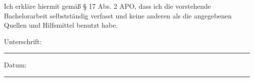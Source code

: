 \documentclass[
11pt, %
english, %
singlespacing, %
parskip, %
headsepline, %
]{MastersDoctoralThesis} %
\newcommand{\abschluss}{Bachelor}
\begin{document}



\mainmatter %

\pagestyle{thesis} %

%
%
%
%


\appendix %



%
%


\begin{declaration}
\addchaptertocentry{\authorshipname} %
Ich erkläre hiermit gemäß § 17 Abs. 2 APO, dass ich die vorstehende {\abschluss}arbeit selbstständig verfasst und keine anderen als die angegebenen Quellen und Hilfsmittel benutzt habe.


\noindent Unterschrift:\\
\rule[0.5em]{25em}{0.5pt} %

\noindent Datum:\\
\rule[0.5em]{25em}{0.5pt} %
\end{declaration}
\end{document}
